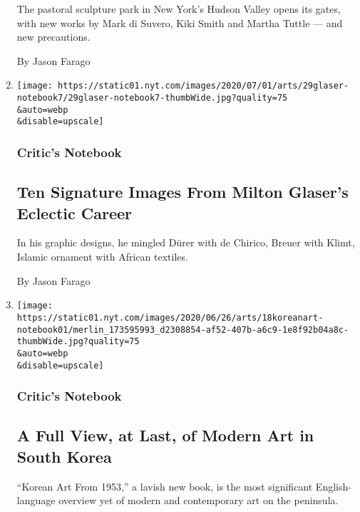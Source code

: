\begin{enumerate}
  The pastoral sculpture park in New York's Hudson Valley opens its
  gates, with new works by Mark di Suvero, Kiki Smith and Martha Tuttle
  --- and new precautions.

  By Jason Farago
\item
  \href{/2020/06/30/arts/design/milton-glaser-graphic-design.html}{}

  \texttt{[image: https://static01.nyt.com/images/2020/07/01/arts/29glaser-notebook7/29glaser-notebook7-thumbWide.jpg?quality=75\\\&auto=webp\\\&disable=upscale]}

  \hypertarget{critics-notebook-3}{%
  \subsubsection{Critic's Notebook}\label{critics-notebook-3}}

  \hypertarget{ten-signature-images-from-milton-glasers-eclectic-career}{%
  \subsection{Ten Signature Images From Milton Glaser's Eclectic
  Career}\label{ten-signature-images-from-milton-glasers-eclectic-career}}

  In his graphic designs, he mingled Dürer with de Chirico, Breuer with
  Klimt, Islamic ornament with African textiles.

  By Jason Farago
\item
  \href{/2020/06/25/arts/design/korean-modern-art-book.html}{}

  \texttt{[image: https://static01.nyt.com/images/2020/06/26/arts/18koreanart-notebook01/merlin\_173595993\_d2308854-af52-407b-a6c9-1e8f92b04a8c-thumbWide.jpg?quality=75\\\&auto=webp\\\&disable=upscale]}

  \hypertarget{critics-notebook-4}{%
  \subsubsection{Critic's Notebook}\label{critics-notebook-4}}

  \hypertarget{a-full-view-at-last-of-modern-art-in-south-korea}{%
  \subsection{A Full View, at Last, of Modern Art in South
  Korea}\label{a-full-view-at-last-of-modern-art-in-south-korea}}

  ``Korean Art From 1953,'' a lavish new book, is the most significant
  English-language overview yet of modern and contemporary art on the
  peninsula.


\end{enumerate}
